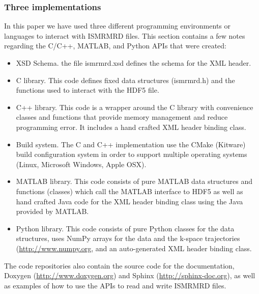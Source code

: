\documentclass[12pt]{article}
\begin{document}
\subsubsection*{Three implementations}
In this paper we have used three different programming environments or languages to interact with ISMRMRD files. This section contains a few notes regarding the C/C++, MATLAB, and Python APIs that were created:
\begin{itemize}
\item{XSD Schema.} the file ismrmrd.xsd defines the schema for the XML header.
\item{C library.}  This code defines fixed data structures (ismrmrd.h) and the functions used to interact with the HDF5 file.
\item{C++ library.} This code is a wrapper around the C library with convenience classes and functions that provide memory management and reduce programming error.  It includes a hand crafted XML header binding class.  
\item{Build system.} The C and C++ implementation use the CMake (Kitware) build configuration system in order to support multiple operating systems (Linux, Microsoft Windows, Apple OSX).
\item{MATLAB library.} This code consists of pure MATLAB data structures and functions (classes) which call the MATLAB interface to HDF5 as well as hand crafted Java code for the XML header binding class using the Java provided by MATLAB.
\item{Python library.} This code consists of pure Python classes for the data structures, uses NumPy arrays for the data and the k-space trajectories (\url{http://www.numpy.org}, and an auto-generated XML header binding class.
\end{itemize}

The code repositories also contain the source code for the documentation, Doxygen (\url{http://www.doxygen.org}) and Sphinx (\url{http://sphinx-doc.org}), as well as examples of how to use the APIs to read and write ISMRMRD files.
\end{document}
